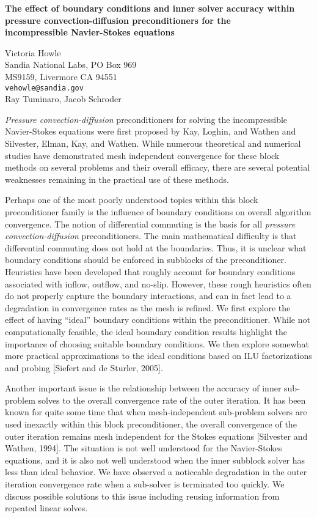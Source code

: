 \documentclass{report}
\begin{document}

\begin{center}
{\large
{\bf The effect of boundary conditions and inner solver accuracy
within  \\ pressure convection-diffusion preconditioners for
the \\ incompressible Navier-Stokes equations}}

	Victoria Howle \\
	Sandia National Labs, PO Box 969 \\
	MS9159, Livermore CA 94551 \\
	{\tt vehowle@sandia.gov} \\
	Ray Tuminaro, Jacob Schroder
\end{center}
{\it Pressure convection-diffusion} preconditioners for
solving the incompressible Navier-Stokes equations were
first proposed by Kay, Loghin, and Wathen and Silvester,
Elman, Kay, and Wathen. While numerous theoretical and
numerical studies have demonstrated mesh independent
convergence for these block methods on several problems and
their overall efficacy, there are several potential
weaknesses remaining in the practical use of these methods.

Perhaps one of the most poorly understood topics within
this block preconditioner family is the influence of
boundary conditions on overall algorithm convergence. The
notion of differential commuting is the basis for all {\it
pressure convection-diffusion} preconditioners. The main
mathematical difficulty is that differential commuting does
not hold at the boundaries. Thus, it is unclear what
boundary conditions should be enforced in subblocks of the
preconditioner. Heuristics have been developed that roughly
account for boundary conditions associated with inflow,
outflow, and no-slip. However, these rough heuristics often
do not properly capture the boundary interactions, and can
in fact lead to a degradation in convergence rates as the
mesh is refined. We first explore the effect of having
``ideal'' boundary conditions within the preconditioner.
While not computationally feasible, the ideal boundary
condition results highlight the importance of choosing
suitable boundary conditions. We then explore somewhat more
practical approximations to the ideal conditions based on
ILU factorizations and probing [Siefert and de Sturler,
2005].

Another important issue is the relationship
between the accuracy of inner sub-problem solves to the
overall convergence rate of the outer iteration. It has been
known for quite some time that when mesh-independent
sub-problem solvers are used inexactly within this block
preconditioner, the overall convergence of the outer
iteration remains mesh independent for the Stokes equations
[Silvester and Wathen, 1994]. The situation is not well
understood for the Navier-Stokes equations, and it is also
not well understood when the inner subblock solver has less
than ideal behavior. We have observed a noticeable
degradation in the outer iteration convergence rate when a
sub-solver is terminated too quickly. We discuss possible
solutions to this issue including reusing information from
repeated linear solves.



\end{document}
